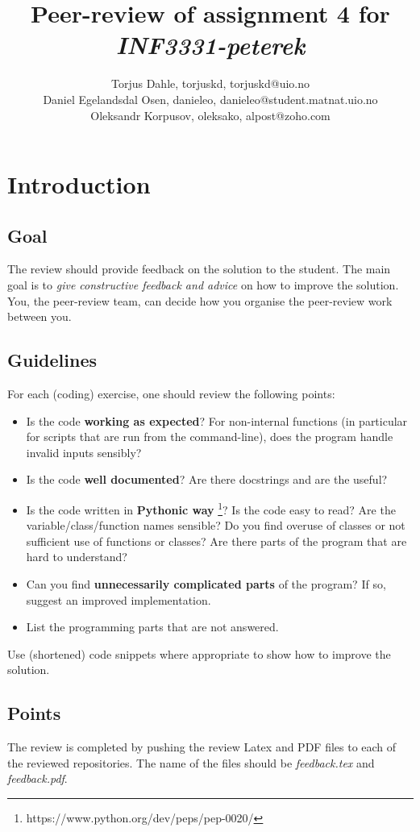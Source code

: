 \documentclass[a4paper]{article}
\title{Peer-review of assignment 4 for \textit{INF3331-peterek}}
\author{Torjus Dahle, torjuskd, {torjuskd@uio.no} \\
 		Daniel Egelandsdal Osen, danieleo, {danieleo@student.matnat.uio.no} \\
		Oleksandr Korpusov, oleksako, {alpost@zoho.com}}
\begin{document}
\maketitle

\section{Introduction}
\subsection{Goal}
The review should provide feedback on the solution to the student. The main goal is to \emph{give constructive feedback and advice} on how to improve the solution. You, the peer-review team, can decide how you organise the peer-review work between you. 

\subsection{Guidelines}\label{sec:general_review}
For each (coding) exercise, one should review the following points:

\begin{itemize}
  \item Is the code \textbf{working as expected}? For non-internal functions (in particular for scripts that are run from the command-line), does the program handle invalid inputs sensibly?
  \item Is the code \textbf{well documented}? Are there docstrings and are the useful?
  \item Is the code written in \textbf{Pythonic way} \footnote{https://www.python.org/dev/peps/pep-0020/}? Is the code easy to read? Are the variable/class/function names sensible? Do you find overuse of classes or not sufficient use of functions or classes? Are there parts of the program that are hard to understand? 
  \item Can you find \textbf{unnecessarily complicated parts} of the program? If so, suggest an improved implementation.
  \item List the programming parts that are not answered.
\end{itemize}
Use (shortened) code snippets where appropriate to show how to improve the solution. 

\subsection{Points}
The review is completed by pushing the review Latex and PDF files to each of the reviewed repositories. The name of the files should be \emph{feedback.tex} and \emph{feedback.pdf}.
\end{document}
